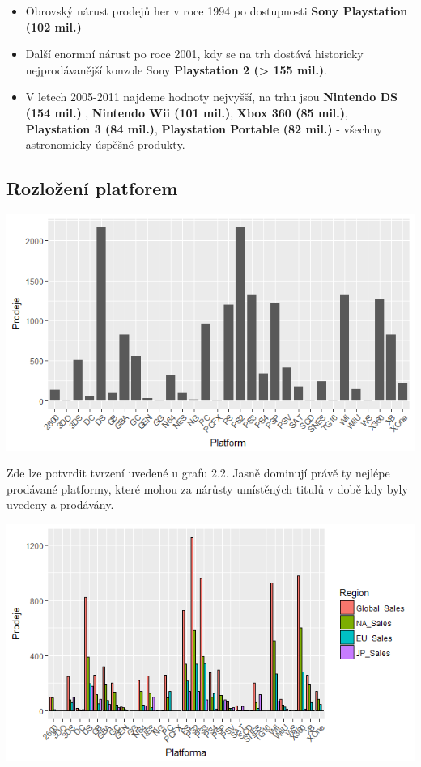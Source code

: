 \documentclass[a4paper,11pt]{article}
\begin{document}
\begin{itemize}
\item Obrovský nárust prodejů her v roce 1994 po dostupnosti \textbf{Sony Playstation (102 mil.)}

\item Další enormní nárust po roce 2001, kdy se na trh dostává historicky nejprodávanější konzole Sony \textbf{Playstation 2 (> 155 mil.)}.

\item V letech 2005-2011 najdeme hodnoty nejvyšší, na trhu jsou \textbf{Nintendo DS (154 mil.)} , \textbf{Nintendo Wii (101 mil.)}, \textbf{Xbox 360 (85 mil.)}, \textbf{Playstation 3 (84 mil.)}, \textbf{Playstation Portable (82 mil.)}  - všechny astronomicky úspěšné produkty.
\end{itemize}


\newpage

\subsection{Rozložení platforem}

\includegraphics[scale=0.75]{Rplot03}

Zde lze potvrdit tvrzení uvedené u grafu 2.2. Jasně dominují právě ty nejlépe prodávané platformy, které mohou za nárůsty umístěných titulů v době kdy byly uvedeny a prodávány. 



\includegraphics[scale=0.9]{Rplot02}
\end{document}
